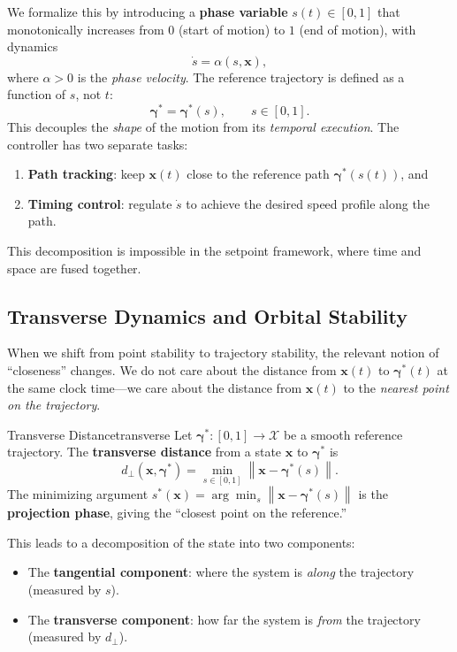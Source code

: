 \documentclass[12pt, openany]{book}
\theoremstyle{plain}
\newcommand{\state}{\bm{x}}
\newcommand{\traj}{\bm{\gamma}}
\newcommand{\statespace}{\mathcal{X}}
\newcommand{\norm}[1]{\left\lVert #1 \right\rVert}
\begin{document}
We formalize this by introducing a \textbf{phase variable} $s(t) \in [0, 1]$ that
monotonically increases from $0$ (start of motion) to $1$ (end of motion), with
dynamics
\begin{equation}\label{eq:phase}
  \dot{s} = \alpha(s, \state),
\end{equation}
where $\alpha > 0$ is the \emph{phase velocity}. The reference trajectory is defined
as a function of $s$, not $t$:
\begin{equation}
  \traj^* = \traj^*(s), \qquad s \in [0, 1].
\end{equation}
This decouples the \emph{shape} of the motion from its \emph{temporal execution}.
The controller has two separate tasks:
\begin{enumerate}[label=(\alph*)]
  \item \textbf{Path tracking}: keep $\state(t)$ close to the reference path
        $\traj^*(s(t))$, and
  \item \textbf{Timing control}: regulate $\dot{s}$ to achieve the desired
        speed profile along the path.
\end{enumerate}
This decomposition is impossible in the setpoint framework, where time and space
are fused together.

\subsection{Transverse Dynamics and Orbital Stability}

When we shift from point stability to trajectory stability, the relevant notion of
``closeness'' changes. We do not care about the distance from $\state(t)$ to
$\traj^*(t)$ at the same clock time---we care about the distance from $\state(t)$
to the \emph{nearest point on the trajectory}.

\begin{definition}{Transverse Distance}{transverse}
  Let $\traj^*: [0,1] \to \statespace$ be a smooth reference trajectory. The
  \textbf{transverse distance} from a state $\state$ to $\traj^*$ is
  \begin{equation}
    d_\perp(\state, \traj^*) = \min_{s \in [0,1]} \norm{\state - \traj^*(s)}.
  \end{equation}
  The minimizing argument $s^*(\state) = \arg\min_s \norm{\state - \traj^*(s)}$
  is the \textbf{projection phase}, giving the ``closest point on the reference.''
\end{definition}

This leads to a decomposition of the state into two components:
\begin{itemize}[leftmargin=1.5cm]
  \item The \textbf{tangential component}: where the system is \emph{along} the
        trajectory (measured by $s$).
  \item The \textbf{transverse component}: how far the system is \emph{from} the
        trajectory (measured by $d_\perp$).
\end{itemize}
\end{document}
